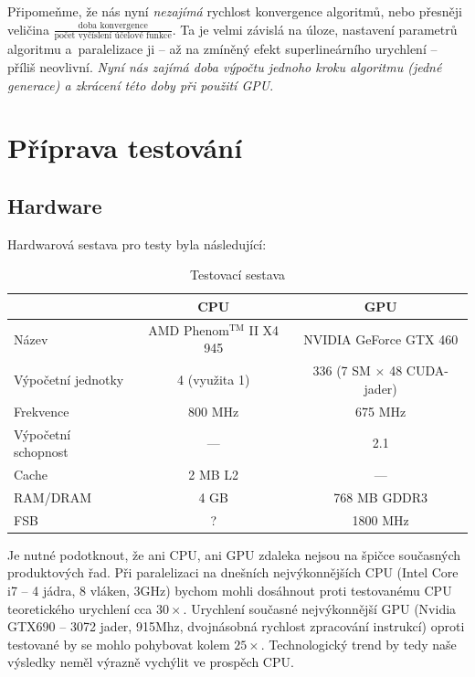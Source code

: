 
Připomeňme, že nás nyní \emph{nezajímá} rychlost konvergence algoritmů, nebo přesněji veličina $\frac{\text{doba konvergence}}{\text{počet vyčíslení účelové funkce}}$. Ta je velmi závislá na úloze, nastavení parametrů algoritmu a~paralelizace ji -- až na zmíněný efekt superlineárního urychlení -- příliš neovlivní. \emph{Nyní nás zajímá doba výpočtu jednoho kroku algoritmu (jedné generace) a zkrácení této doby při použití GPU}.

\section{Příprava testování}
\subsection{Hardware}

Hardwarová sestava pro testy byla následující:

\begin{table}[h]
    \begin{center}
    \begin{tabular}{lcc}
      \toprule
      & CPU & GPU \\
      \midrule
      Název & AMD Phenom$^\mathrm{TM}$ II X4 945 & NVIDIA GeForce GTX 460 \\
      Výpočetní jednotky & 4 (využita 1) & 336 (7 SM $\times$ 48 CUDA-jader) \\
      Frekvence & 800 MHz & 675 MHz \\
      Výpočetní schopnost & --- & 2.1 \\
      Cache & 2 MB L2 & --- \\
      RAM/DRAM & 4 GB & 768 MB GDDR3 \\
      FSB & ? & 1800 MHz \\
      \bottomrule
    \end{tabular}
    \caption{Testovací sestava}
    \end{center}
\end{table}

Je nutné podotknout, že ani CPU, ani GPU zdaleka nejsou na špičce současných produktových řad. Při paralelizaci na dnešních nejvýkonnějších CPU (Intel Core i7 -- 4 jádra, 8 vláken, 3GHz) bychom mohli dosáhnout proti testovanému CPU teoretického urychlení cca $30\times$. Urychlení současné nejvýkonnější GPU (Nvidia GTX690 -- 3072 jader, 915Mhz, dvojnásobná rychlost zpracování instrukcí) oproti testované by se mohlo pohybovat kolem $25\times$. Technologický trend by tedy naše výsledky neměl výrazně vychýlit ve prospěch CPU.

